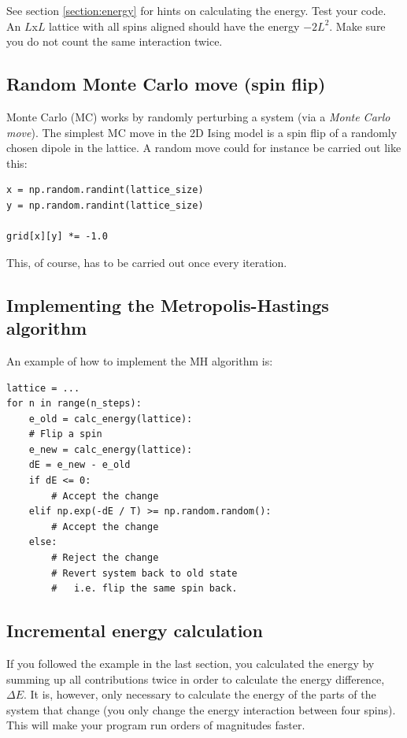 \documentclass{article}
\begin{document}
See section \ref{section:energy} for hints on calculating the energy.
Test your code.
An $L$x$L$ lattice with all spins aligned should have the energy $-2L^2$.
Make sure you do not count the same interaction twice.\\

\subsection{Random Monte Carlo move (spin flip)}

Monte Carlo (MC) works by randomly perturbing a system (via a \textit{Monte Carlo move}).
The simplest MC move in the 2D Ising model is a spin flip of a randomly chosen dipole in the lattice.
A random move could for instance be carried out like this:

\begin{lstlisting}
x = np.random.randint(lattice_size)
y = np.random.randint(lattice_size)

grid[x][y] *= -1.0
\end{lstlisting}

This, of course, has to be carried out once every iteration.

\subsection{Implementing the Metropolis-Hastings algorithm}

An example of how to implement the MH algorithm is: 

\begin{lstlisting}
lattice = ...
for n in range(n_steps):
    e_old = calc_energy(lattice):
    # Flip a spin
    e_new = calc_energy(lattice):
    dE = e_new - e_old
    if dE <= 0:
        # Accept the change
    elif np.exp(-dE / T) >= np.random.random():
        # Accept the change
    else:
        # Reject the change
        # Revert system back to old state
        #   i.e. flip the same spin back.
\end{lstlisting}

\subsection{Incremental energy calculation}

If you followed the example in the last section, you calculated the energy by summing up all contributions twice in order to calculate the energy difference, $\Delta E$.
It is, however, only necessary to calculate the energy of the parts of the system that change (you only change the energy interaction between four spins).
This will make your program run orders of magnitudes faster.\\
\end{document}
